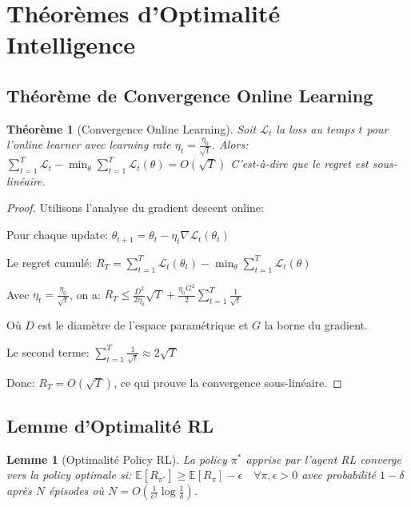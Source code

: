 \documentclass[12pt,a4paper]{article}
\newtheorem{theorem}{Théorème}
\newtheorem{lemma}{Lemme}
\begin{document}
\section{Théorèmes d'Optimalité Intelligence}

\subsection{Théorème de Convergence Online Learning}

\begin{theorem}[Convergence Online Learning]
Soit $\mathcal{L}_t$ la loss au temps $t$ pour l'online learner avec learning rate $\eta_t = \frac{\eta_0}{\sqrt{t}}$. Alors:
$\sum_{t=1}^{T} \mathcal{L}_t - \min_{\theta} \sum_{t=1}^{T} \mathcal{L}_t(\theta) = O(\sqrt{T})$
C'est-à-dire que le regret est sous-linéaire.
\end{theorem}

\begin{proof}
Utilisons l'analyse du gradient descent online:

Pour chaque update: $\theta_{t+1} = \theta_t - \eta_t \nabla \mathcal{L}_t(\theta_t)$

Le regret cumulé:
$R_T = \sum_{t=1}^{T} \mathcal{L}_t(\theta_t) - \min_{\theta} \sum_{t=1}^{T} \mathcal{L}_t(\theta)$

Avec $\eta_t = \frac{\eta_0}{\sqrt{t}}$, on a:
$R_T \leq \frac{D^2}{2\eta_0}\sqrt{T} + \frac{\eta_0 G^2}{2}\sum_{t=1}^{T}\frac{1}{\sqrt{t}}$

Où $D$ est le diamètre de l'espace paramétrique et $G$ la borne du gradient.

Le second terme: $\sum_{t=1}^{T}\frac{1}{\sqrt{t}} \approx 2\sqrt{T}$

Donc: $R_T = O(\sqrt{T})$, ce qui prouve la convergence sous-linéaire.
\end{proof}

\subsection{Lemme d'Optimalité RL}

\begin{lemma}[Optimalité Policy RL]
La policy $\pi^*$ apprise par l'agent RL converge vers la policy optimale si:
$\mathbb{E}[R_{\pi^*}] \geq \mathbb{E}[R_{\pi}] - \epsilon \quad \forall \pi, \epsilon > 0$
avec probabilité $1-\delta$ après $N$ épisodes où $N = O(\frac{1}{\epsilon^2}\log\frac{1}{\delta})$.
\end{lemma}
\end{document}
